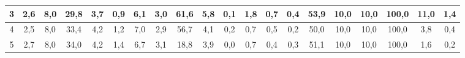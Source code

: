 \begin{sidewaystable}[]
\begin{tabular}{|c|c|c|c|c|c|c|c|c|c|c|c|c|c|c|c|c|c|c|c|}
    3  & 2,6                                              & 8,0                                              & 29,8                                             & 3,7                                              & 0,9                                              & 6,1                                              & 3,0                                              & 61,6                                             & 5,8                                              & 0,1                                              & 1,8                                              & 0,7                                              & 0,4                                              & 53,9                                            & 10,0                                            & 10,0                                            & 100,0                                           & 11,0                                            & 1,4                                             \\ \hline
    4  & 2,5                                              & 8,0                                              & 33,4                                             & 4,2                                              & 1,2                                              & 7,0                                              & 2,9                                              & 56,7                                             & 4,1                                              & 0,2                                              & 0,7                                              & 0,5                                              & 0,2                                              & 50,0                                            & 10,0                                            & 10,0                                            & 100,0                                           & 3,8                                             & 0,4                                             \\ \hline
    5  & 2,7                                              & 8,0                                              & 34,0                                             & 4,2                                              & 1,4                                              & 6,7                                              & 3,1                                              & 18,8                                             & 3,9                                              & 0,0                                              & 0,7                                              & 0,4                                              & 0,3                                              & 51,1                                            & 10,0                                            & 10,0                                            & 100,0                                           & 1,6                                             & 0,2                                             \\ \hline

\end{tabular}
\end{sidewaystable}
